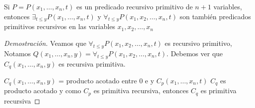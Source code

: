 \begin{theorem}
Si $P = P(x_1, \ldots, x_n, t)$ es un predicado recursivo primitivo de $n + 1$ variables, entonces $\exists_{t \leq y} P(x_1, \ldots, x_n, t)$ y $\forall_{t \leq y} P(x_1, x_2, \ldots, x_n, t)$ son tambi\'en predicados primitivos recursivos en las variables $x_1, x_2, \ldots, x_n$
\end{theorem}
 
\begin{proof}[Demostraci\'on]
Veamos que $\forall_{t \leq y} P(x_1, x_2, \ldots, x_n, t)$ es  recursivo primitivo, Notamos $Q(x_1, \ldots, x_n, y) = \forall_{t \leq y} P(x_1, x_2, \ldots, x_n, t)$. Debemos ver que $C_q(x_1, \ldots, x_n, y)$ es recursiva primitiva.
 
$C_q(x_1, \ldots, x_n, y)$ = producto acotado entre 0 e y $C_p(x_1, \ldots, x_n, t)$ $C_q$ es producto acotado y como $C_p$ es primitiva recursiva, entonces $C_q$ es primitiva recursiva
\end{proof}
 
\begin{comment}
 
\begin{example}
g(y) = \exists x \; P(x, y)
 
g(y) =
 
1 si P(x, y) es verdadero para alg\'un x
 
0 sino
 
Si hago un programa en S puede ser que nunca llegue a valer 0
 
\end{example}
 
 
 
 
Teorema
 
Si P = P(x_1, x_2, ..., x_n, t) es un predicado recursivo primitivo de n + 1 variables entonces
 
\exists t \leq y P .... y \forall t \leq y P .... son tambi\'en predicados primitivos recursivos en las variables x_1, x_2, ... x_n, y
 
 
Prueba
 
 
\end{comment}